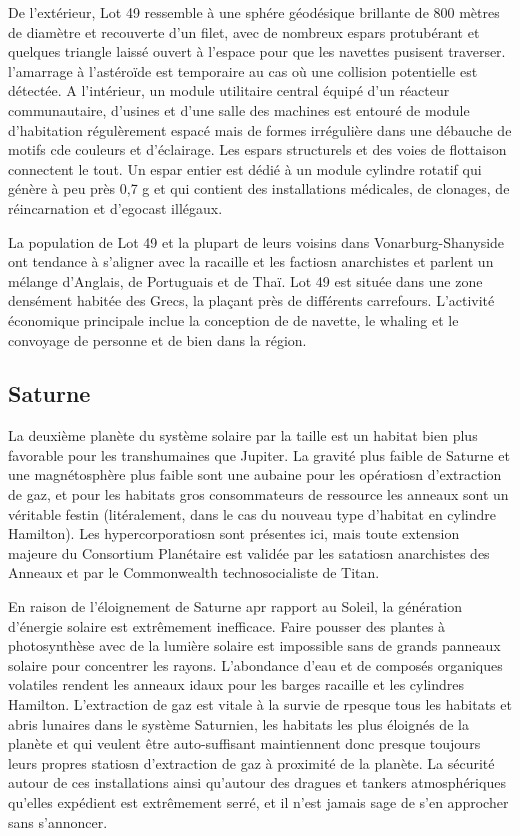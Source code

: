 De l'extérieur, Lot 49 ressemble à une sphére géodésique brillante de 800 mètres de diamètre et recouverte d'un filet, avec de nombreux espars protubérant et quelques triangle laissé ouvert à l'espace pour que les navettes pusisent traverser. l'amarrage à l'astéroïde est temporaire au cas où une collision potentielle est détectée. A l'intérieur, un module utilitaire central équipé d'un réacteur communautaire, d'usines et d'une salle des machines est entouré de module d'habitation régulèrement espacé mais de formes irrégulière dans une débauche de motifs cde couleurs et d'éclairage. Les espars structurels et des voies de flottaison connectent le tout. Un espar entier est dédié à un module cylindre rotatif qui génère à peu près 0,7 g et qui contient des installations médicales, de clonages, de réincarnation et d'egocast illégaux. 

La population de Lot 49 et la plupart de leurs voisins dans Vonarburg-Shanyside ont tendance à s'aligner avec la racaille et les factiosn anarchistes et parlent un mélange d'Anglais, de Portuguais et de Thaï. Lot 49 est située dans une zone densément habitée des Grecs, la plaçant près de différents carrefours. L'activité économique principale inclue la conception de de navette, le whaling et le convoyage de personne et de bien dans la région. 

\subsection{Saturne} \label{sec:saturn} 

La deuxième planète du système solaire par la taille est un habitat bien plus favorable pour les transhumaines que Jupiter. La gravité plus faible de Saturne et une magnétosphère plus faible sont une aubaine pour les opératiosn d'extraction de gaz, et pour les habitats gros consommateurs de ressource les anneaux sont un véritable festin (litéralement, dans le cas du nouveau type d'habitat en cylindre Hamilton). Les hypercorporatiosn sont présentes ici, mais toute extension majeure du Consortium Planétaire est validée par les satatiosn anarchistes des Anneaux et par le Commonwealth technosocialiste de Titan. 

En raison de l'éloignement de Saturne apr rapport au Soleil, la génération d'énergie solaire est extrêmement inefficace. Faire pousser des plantes à photosynthèse avec de la lumière solaire est impossible sans de grands panneaux solaire pour concentrer les rayons. L'abondance d'eau et de composés organiques volatiles rendent les anneaux idaux pour les barges racaille et les cylindres Hamilton. L'extraction de gaz est vitale à la survie de rpesque tous les habitats et abris lunaires dans le système Saturnien, les habitats les plus éloignés de la planète et qui veulent être auto-suffisant maintiennent donc presque toujours leurs propres statiosn d'extraction de gaz à proximité de la planète. La sécurité autour de ces installations ainsi qu'autour des dragues et tankers atmosphériques qu'elles expédient est extrêmement serré, et il n'est jamais sage de s'en approcher sans s'annoncer. 

